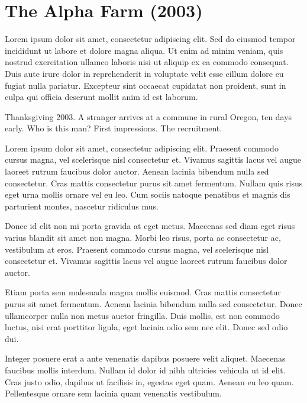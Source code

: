 

\chapter{The Alpha Farm (2003)}
\label{t2:ch01:alpha-farm}


\vspace{0.5cm}


\vspace{0.5cm}

Lorem ipsum dolor sit amet, consectetur adipiscing elit. Sed do eiusmod tempor incididunt ut labore et dolore magna aliqua. Ut enim ad minim veniam, quis nostrud exercitation ullamco laboris nisi ut aliquip ex ea commodo consequat. Duis aute irure dolor in reprehenderit in voluptate velit esse cillum dolore eu fugiat nulla pariatur. Excepteur sint occaecat cupidatat non proident, sunt in culpa qui officia deserunt mollit anim id est laborum.

Thanksgiving 2003. A stranger arrives at a commune in rural Oregon, ten days early. Who is this man? First impressions. The recruitment.

Lorem ipsum dolor sit amet, consectetur adipiscing elit. Praesent commodo cursus magna, vel scelerisque nisl consectetur et. Vivamus sagittis lacus vel augue laoreet rutrum faucibus dolor auctor. Aenean lacinia bibendum nulla sed consectetur. Cras mattis consectetur purus sit amet fermentum. Nullam quis risus eget urna mollis ornare vel eu leo. Cum sociis natoque penatibus et magnis dis parturient montes, nascetur ridiculus mus.

Donec id elit non mi porta gravida at eget metus. Maecenas sed diam eget risus varius blandit sit amet non magna. Morbi leo risus, porta ac consectetur ac, vestibulum at eros. Praesent commodo cursus magna, vel scelerisque nisl consectetur et. Vivamus sagittis lacus vel augue laoreet rutrum faucibus dolor auctor.

Etiam porta sem malesuada magna mollis euismod. Cras mattis consectetur purus sit amet fermentum. Aenean lacinia bibendum nulla sed consectetur. Donec ullamcorper nulla non metus auctor fringilla. Duis mollis, est non commodo luctus, nisi erat porttitor ligula, eget lacinia odio sem nec elit. Donec sed odio dui.

Integer posuere erat a ante venenatis dapibus posuere velit aliquet. Maecenas faucibus mollis interdum. Nullam id dolor id nibh ultricies vehicula ut id elit. Cras justo odio, dapibus ut facilisis in, egestas eget quam. Aenean eu leo quam. Pellentesque ornare sem lacinia quam venenatis vestibulum.

\chapterreturn
